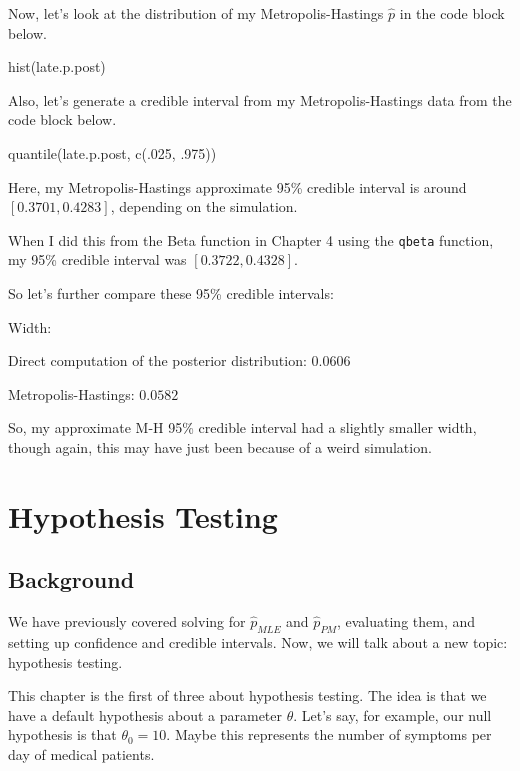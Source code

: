 \documentclass[
  letterpaper,
  DIV=11,
  numbers=noendperiod]{scrreprt}
\newenvironment{Shaded}{\begin{snugshade}}{\end{snugshade}}
\newcommand{\NormalTok}[1]{\textcolor[rgb]{0.00,0.23,0.31}{#1}}
\begin{document}
Now, let's look at the distribution of my Metropolis-Hastings
\(\hat{p}\) in the code block below.

\begin{Shaded}
\begin{Highlighting}[]
\NormalTok{hist(late.p.post)}
\end{Highlighting}
\end{Shaded}

Also, let's generate a credible interval from my Metropolis-Hastings
data from the code block below.

\begin{Shaded}
\begin{Highlighting}[]
\NormalTok{quantile(late.p.post, c(.025, .975))}
\end{Highlighting}
\end{Shaded}

Here, my Metropolis-Hastings approximate 95\% credible interval is
around \([0.3701, 0.4283]\), depending on the simulation.

When I did this from the Beta function in Chapter 4 using the
\texttt{qbeta} function, my 95\% credible interval was
\([0.3722, 0.4328]\).

So let's further compare these 95\% credible intervals:

Width:

Direct computation of the posterior distribution: \(0.0606\)

Metropolis-Hastings: \(0.0582\)

So, my approximate M-H 95\% credible interval had a slightly smaller
width, though again, this may have just been because of a weird
simulation.


\chapter{Hypothesis Testing}\label{hypothesis-testing}

\section{Background}\label{background-6}

We have previously covered solving for \(\hat{p}_{MLE}\) and
\(\hat{p}_{PM}\), evaluating them, and setting up confidence and
credible intervals. Now, we will talk about a new topic: hypothesis
testing.

This chapter is the first of three about hypothesis testing. The idea is
that we have a default hypothesis about a parameter \(\theta\). Let's
say, for example, our null hypothesis is that \(\theta_0 = 10\). Maybe
this represents the number of symptoms per day of medical patients.
\end{document}
